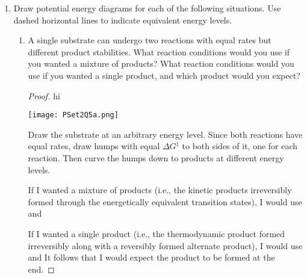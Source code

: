 \documentclass[../psets.tex]{subfiles}
\begin{document}
\begin{enumerate}
\begin{enumerate}
\begin{proof}
            This singlet carbene can then be approached (on either face!) by the other reactant. I predict that the carbene will react with its HOMO since it is receiving electron density from a $\pi$-donor, while the other reactant will react with its LUMO since it has two adjacent ester EWGs. With the phasing match of a nonlinear approach, the next step will be a chelotropic $[2+1]$ cycloaddition, forming our product. The \emph{trans}-EWGs of the alkene will yield a \emph{trans}-product, but --- as mentioned above --- we will get some of both diastereomers with respect to the other bond because the carbene has two faces open to nonlinear approach.
        \end{proof}
        \item Discuss the stability of the intermediate(s) and predict the stereochemistry of the product.
        \begin{proof}
            See part (a).
        \end{proof}
    \end{enumerate}
    \pagebreak
    \item Draw potential energy diagrams for each of the following situations. Use dashed horizontal lines to indicate equivalent energy levels.
    \begin{enumerate}
        \item A single substrate can undergo two reactions with equal rates but different product stabilities. What reaction conditions would you use if you wanted a mixture of products? What reaction conditions would you use if you wanted a single product, and which product would you expect?
        \begin{proof}
            {\color{white}hi}
            \begin{center}
                \texttt{[image: PSet2Q5a.png]}
            \end{center}
            Draw the substrate at an arbitrary energy level. Since both reactions have equal rates, draw humps with equal $\Delta G^\ddagger$ to both sides of it, one for each reaction. Then curve the humps down to products at different energy levels.\par
            If I wanted a mixture of products (i.e., the kinetic products irreversibly formed through the energetically equivalent transition states), I would use  and \par
            If I wanted a single product (i.e., the thermodynamic product formed irreversibly along with a reversibly formed alternate product), I would use  and  It follows that I would expect the  product to be formed at the end.

\end{proof}
\end{enumerate}
\end{enumerate}
\end{document}
